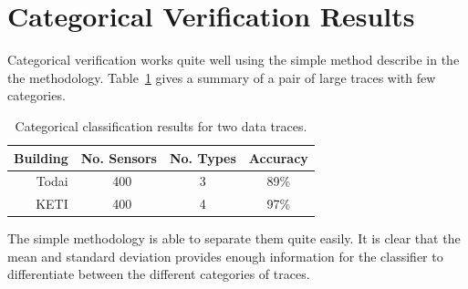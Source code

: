 \section{Categorical Verification Results}

Categorical verification works quite well using the simple method describe in the the methodology.  Table~\ref{tab:type_class}
gives a summary of a pair of large traces with few categories.

\begin{table}[h]
\begin{center}
\begin{tabular}{| r | c | c | c |}
	\hline
	\textbf{Building} & \textbf{No. Sensors} & \textbf{No. Types} & \textbf{Accuracy}\\ \hline
	Todai & ~400 & 3 & 89\%    \\ \hline

	KETI & ~400 & 4 & 97\% 	 	\\ \hline

\end{tabular}
\caption{Categorical classification results for two data traces.}
\label{tab:type_class}
\end{center}
\end{table}

The simple methodology is able to separate them quite easily.  It is clear that the mean and standard deviation provides enough
information for the classifier to differentiate between the different categories of traces.





